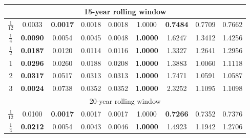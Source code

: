 \documentclass[12pt,a4paper]{article}
\begin{document}
\begin{table}[]
\begin{tabular}{ccccccccc}
\multicolumn{9}{|c|}{15-year rolling window}                                                                                                                                                                                     \\ \hline
\multicolumn{1}{|c|}{$ \frac{1}{12} $} & 0.0033          & \textbf{0.0017} & 0.0018          & \multicolumn{1}{c|}{0.0018}          & 1.0000          & \textbf{0.7484} & 0.7709          & \multicolumn{1}{c|}{0.7662}          \\
\multicolumn{1}{|c|}{$ \frac{1}{4} $}  & \textbf{0.0090} & 0.0054          & 0.0045          & \multicolumn{1}{c|}{0.0048}          & \textbf{1.0000} & 1.6247          & 1.3412          & \multicolumn{1}{c|}{1.4256}          \\
\multicolumn{1}{|c|}{$ \frac{1}{2} $}  & \textbf{0.0187} & 0.0120          & 0.0114          & \multicolumn{1}{c|}{0.0116}          & \textbf{1.0000} & 1.3327          & 1.2641          & \multicolumn{1}{c|}{1.2956}          \\
\multicolumn{1}{|c|}{1}                & \textbf{0.0296} & 0.0260          & 0.0188          & \multicolumn{1}{c|}{0.0208}          & \textbf{1.0000} & 1.3883          & 1.0060          & \multicolumn{1}{c|}{1.1118}          \\
\multicolumn{1}{|c|}{2}                & \textbf{0.0317} & 0.0517          & 0.0313          & \multicolumn{1}{c|}{0.0313}          & \textbf{1.0000} & 1.7471          & 1.0591          & \multicolumn{1}{c|}{1.0587}          \\
\multicolumn{1}{|c|}{3}                & \textbf{0.0024} & 0.0738          & 0.0352          & \multicolumn{1}{c|}{0.0352}          & \textbf{1.0000} & 2.3252          & 1.1095          & \multicolumn{1}{c|}{1.1098}          \\ \hline
\multicolumn{9}{|c|}{20-year rolling window}                                                                                                                                                                                     \\ \hline
\multicolumn{1}{|c|}{$ \frac{1}{12} $} & 0.0100          & \textbf{0.0017} & 0.0017          & \multicolumn{1}{c|}{0.0017}          & 1.0000          & \textbf{0.7266} & 0.7352          & \multicolumn{1}{c|}{0.7376}          \\
\multicolumn{1}{|c|}{$ \frac{1}{4} $}  & \textbf{0.0212} & 0.0054          & 0.0043          & \multicolumn{1}{c|}{0.0046}          & \textbf{1.0000} & 1.4923          & 1.1942          & \multicolumn{1}{c|}{1.2706}          \\

\end{tabular}
\end{table}
\end{document}
